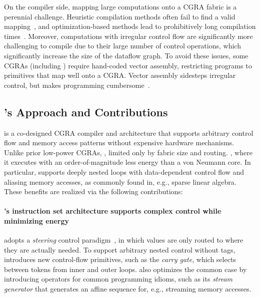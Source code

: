 On the compiler side, mapping large computations onto a CGRA fabric is a 
perennial challenge.
%
Heuristic compilation methods often fail to find a valid
mapping~\cite{chlorophyll,nowatzki2018hybrid}, and optimization-based methods lead to
prohibitively long compilation times~\cite{nowatzki2018hybrid,cgrame-ilp}.
%
Moreover, computations with irregular control flow are significantly
more challenging to compile due to their large number of control
operations, which significantly increase the size of the dataflow
graph.
%
To avoid these issues, some CGRAs (including \snafu) require
hand-coded vector assembly, restricting programs to
primitives that map well onto a CGRA.
%
Vector assembly sidesteps irregular control,
but makes programming cumbersome~\cite{snafu,yang2021spzip,nowatzki:isca17:stream-dataflow}.


\subsection{\riptide's Approach and Contributions}

\riptide is a co-designed CGRA compiler and architecture that
supports arbitrary control flow and memory access patterns
without expensive hardware mechanisms.
%
Unlike prior low-power CGRAs, , limited only by fabric size and routing.
%
,
where it executes with an order-of-magnitude less energy than a von
Neumann core.
%
In particular, \riptide supports deeply nested loops with
data-dependent control flow and aliasing memory accesses,
as commonly found in, e.g., sparse linear algebra.
%
These benefits are realized via the following contributions:

\paragraph{\riptide's instruction set architecture supports complex control while minimizing energy}

%
\riptide adopts a \emph{steering} control
paradigm~\cite{dennis1975preliminary,swanson2003wavescalar,budiu2005dataflow},
in which values are only routed to where they are actually needed.
%
To support arbitrary nested control without tags, \riptide introduces new
control-flow primitives, such as the \emph{carry gate}, which selects
between tokens from inner and outer loops.
%
\riptide also optimizes the common case by introducing operators for
common programming idioms, such as its \emph{stream generator} that
generates an affine sequence for, e.g., streaming memory accesses.

